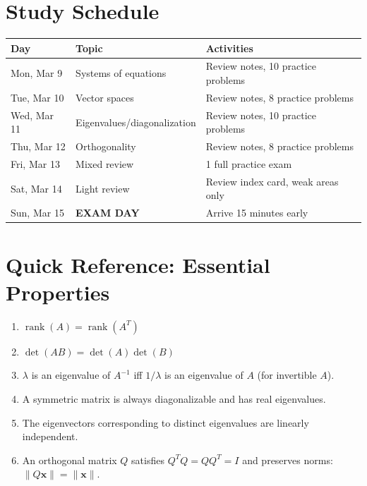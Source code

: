 \documentclass[
    language=english,
    doctype=study-guide,
    institution=none,
]{../../omnilatex}
\begin{document}
\section{Study Schedule}

\begin{center}
\begin{tabular}{|l|l|l|}
\hline
\textbf{Day} & \textbf{Topic} & \textbf{Activities} \\
\hline
Mon, Mar 9 & Systems of equations & Review notes, 10 practice problems \\
\hline
Tue, Mar 10 & Vector spaces & Review notes, 8 practice problems \\
\hline
Wed, Mar 11 & Eigenvalues/diagonalization & Review notes, 10 practice problems \\
\hline
Thu, Mar 12 & Orthogonality & Review notes, 8 practice problems \\
\hline
Fri, Mar 13 & Mixed review & 1 full practice exam \\
\hline
Sat, Mar 14 & Light review & Review index card, weak areas only \\
\hline
Sun, Mar 15 & \textbf{EXAM DAY} & Arrive 15 minutes early \\
\hline
\end{tabular}
\end{center}

\section{Quick Reference: Essential Properties}

\begin{enumerate}
    \item $\operatorname{rank}(A) = \operatorname{rank}(A^T)$
    \item $\det(AB) = \det(A)\det(B)$
    \item $\lambda$ is an eigenvalue of $A^{-1}$ iff $1/\lambda$ is an eigenvalue of $A$ (for invertible $A$).
    \item A symmetric matrix is always diagonalizable and has real eigenvalues.
    \item The eigenvectors corresponding to distinct eigenvalues are linearly independent.
    \item An orthogonal matrix $Q$ satisfies $Q^TQ = QQ^T = I$ and preserves norms: $\|Q\mathbf{x}\| = \|\mathbf{x}\|$.
\end{enumerate}
\end{document}

